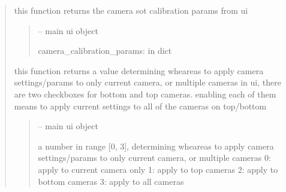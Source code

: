 \documentclass[letterpaper,10pt,english]{sphinxmanual}
\begin{document}
\begin{quote}
\begin{savenotes}\begin{fulllineitems}
\label{\detokenize{setting/backend/camera_funcs:oxin.backend.camera_funcs.get_camera_calibration_params_from_ui}}
\pysigstartsignatures
{}
\pysigstopsignatures
\sphinxAtStartPar
this function returns the camera sot calibration params from ui
\begin{quote}\begin{description}
\sphinxAtStartPar
{} – main ui object

\sphinxAtStartPar
camera\_calibration\_params: in dict

\end{description}\end{quote}

\end{fulllineitems}\end{savenotes}


\begin{savenotes}\begin{fulllineitems}
\label{\detokenize{setting/backend/camera_funcs:oxin.backend.camera_funcs.get_camera_checkbox_values}}
\pysigstartsignatures
{}
\pysigstopsignatures
\sphinxAtStartPar
this function returns a value determining wheareas to apply camera settings/params to only current camera, or multiple cameras
in ui, there are two checkboxes for bottom and top cameras. enabling each of them means to apply current settings to all of the cameras on top/bottom
\begin{quote}\begin{description}
\sphinxAtStartPar
{} – main ui object

\sphinxAtStartPar
a number in range {[}0, 3{]}, determining wheareas to apply camera settings/params to only current camera, or multiple cameras
0: apply to current camera only
1: apply to top cameras
2: apply to bottom cameras
3: apply to all cameras


\end{description}
\end{quote}
\end{fulllineitems}
\end{savenotes}
\end{quote}
\end{document}
